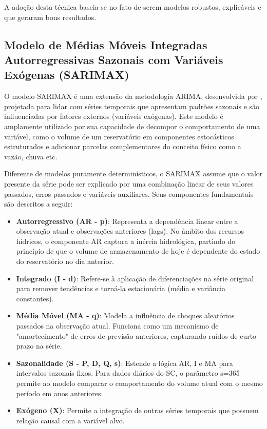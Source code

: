A adoção desta técnica baseia-se no fato de serem modelos robustos, explicáveis e que geraram bons resultados. 

\subsection{Modelo de Médias Móveis Integradas Autorregressivas Sazonais com Variáveis Exógenas (\acrfull{SARIMAX})}

O modelo \acrshort{SARIMAX} é uma extensão da metodologia \acrfull{ARIMA}, desenvolvida por \textcite{box_jenkins}, projetada para lidar com séries temporais que apresentam padrões sazonais e são influenciadas por fatores externos (variáveis exógenas). Este modelo é amplamente utilizado por sua capacidade de decompor o comportamento de uma variável, como o volume de um reservatório em componentes estocásticos estruturados e adicionar parcelas complementares do conceito físico como a vazão, chuva etc. 

Diferente de modelos puramente determinísticos, o \acrshort{SARIMAX} assume que o valor presente da série pode ser explicado por uma combinação linear de seus valores passados, erros passados e variáveis auxiliares. Seus componentes fundamentais são descritos a seguir: 
\begin{itemize}
\item \textbf{Autorregressivo (AR - p)}: Representa a dependência linear entre a observação atual e observações anteriores (lags). No âmbito dos recursos hídricos, o componente AR captura a inércia hidrológica, partindo do princípio de que o volume de armazenamento de hoje é dependente do estado do reservatório no dia anterior. 
\item \textbf{Integrado (I - d)}: Refere-se à aplicação de diferenciações na série original para remover tendências e torná-la estacionária (média e variância constantes).  
\item \textbf{Média Móvel (MA - q)}: Modela a influência de choques aleatórios passados na observação atual. Funciona como um mecanismo de "amortecimento" de erros de previsão anteriores, capturando ruídos de curto prazo na série. 
\item \textbf{Sazonalidade (S - P, D, Q, s)}: Estende a lógica AR, I e MA para intervalos sazonais fixos. Para dados diários do \acrshort{SC}, o parâmetro s=365 permite ao modelo comparar o comportamento do volume atual com o mesmo período em anos anteriores. 
\item \textbf{Exógeno (X)}: Permite a integração de outras séries temporais que possuem relação causal com a variável alvo.
\end{itemize}


